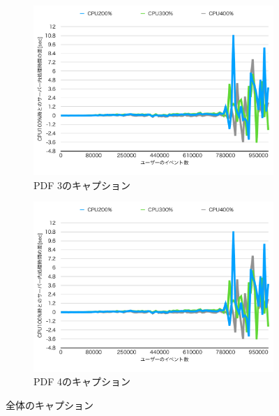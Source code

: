 \documentclass[../../../../../main]{subfiles}
\begin{document}
\begin{figure}[htbp]
        \begin{subfigure}{.48\linewidth}
            \centering
            \includegraphics[width=\linewidth]{graph}
            \caption{PDF 3のキャプション}
            \label{fig:pdf3}
        \end{subfigure}\hfill
        \begin{subfigure}{.48\linewidth}
            \centering
            \includegraphics[width=\linewidth]{graph}
            \caption{PDF 4のキャプション}
            \label{fig:pdf4}
        \end{subfigure}
        \caption{全体のキャプション}
        \label{fig:pdfs}
    \end{figure}
\end{document}
